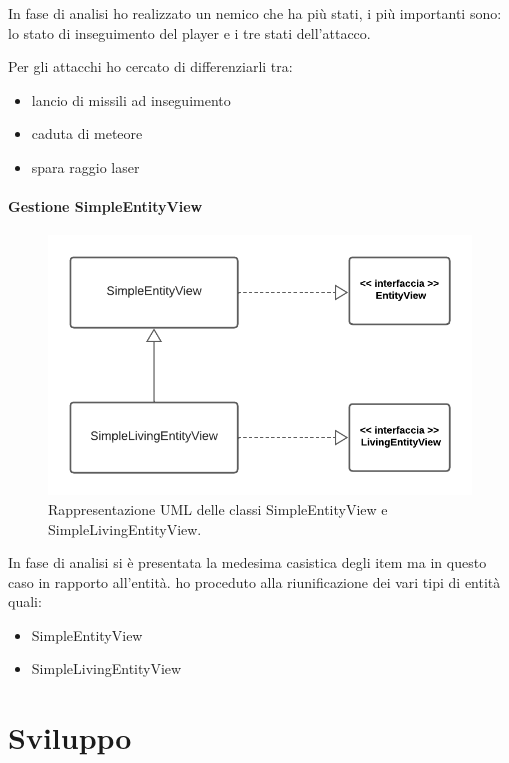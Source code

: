 \documentclass[a4paper,12pt]{report}
\begin{document}
In fase di analisi ho realizzato un nemico che ha più stati, i più importanti sono: lo stato di inseguimento del player e i tre stati dell'attacco. 

Per gli attacchi ho cercato di differenziarli tra:

\begin{itemize}
    \item lancio di missili ad inseguimento
    \item caduta di meteore
    \item spara raggio laser
\end{itemize}
 
\subsubsection{Gestione SimpleEntityView}

\begin{figure}[H]
\centering{}
\includegraphics[scale=1] {img/entities-view.png}
\caption{Rappresentazione UML delle classi SimpleEntityView e SimpleLivingEntityView.}
\label{img:entities-view}
\end{figure}

In fase di analisi si è presentata la medesima casistica degli item ma in questo caso in rapporto all'entità. ho proceduto alla riunificazione dei vari tipi di entità quali:

\begin{itemize}
    \item SimpleEntityView
    \item SimpleLivingEntityView
\end{itemize}

\chapter{Sviluppo}
\end{document}
